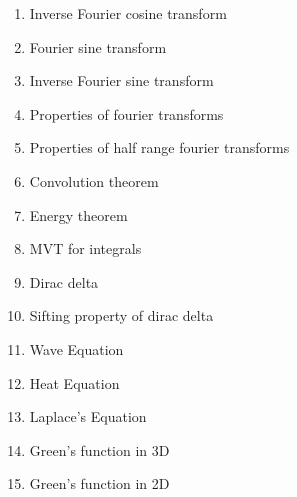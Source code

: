 \documentclass{article}
\begin{document}
\begin{enumerate}
    \item Inverse Fourier cosine transform
    \item Fourier sine transform
    \item Inverse Fourier sine transform
    \item Properties of fourier transforms
    \item Properties of half range fourier transforms
    \item Convolution theorem
    \item Energy theorem
    \item MVT for integrals
    \item Dirac delta
    \item Sifting property of dirac delta
    \item Wave Equation
    \item Heat Equation
    \item Laplace's Equation
    \item Green's function in 3D
    \item Green's function in 2D
\end{enumerate}
\end{document}
